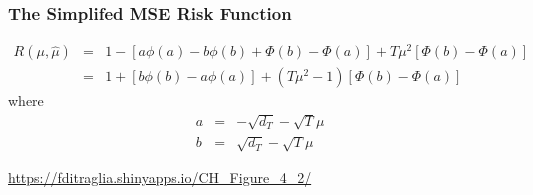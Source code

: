%
%
%
%
%
%
%
%
\begin{frame}
  \frametitle{The Simplifed MSE Risk Function}
	\begin{eqnarray*}
    R(\mu,\widehat{\mu}) &=& 1 - \left[a\phi(a) - b\phi(b) + \Phi(b) - \Phi(a) \right] + T\mu^2 \left[\Phi(b) - \Phi(a) \right]\\
		&=&1 + \left[b\phi(b) - a\phi(a)\right]  + (T\mu^2 - 1) \left[\Phi(b) - \Phi(a) \right] 
	\end{eqnarray*}
where
	\begin{eqnarray*}
		a &=& -\sqrt{d_T} - \sqrt{T}\mu\\
		b &=& \sqrt{d_T} - \sqrt{T}\mu
	\end{eqnarray*}

\url{https://fditraglia.shinyapps.io/CH\_Figure\_4\_2/}
\end{frame}

